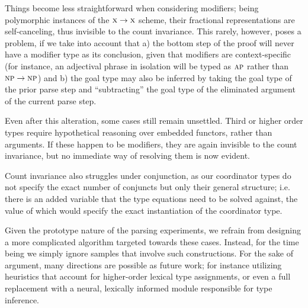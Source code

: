 Things become less straightforward when considering modifiers; being polymorphic instances of the $\textsc{x} \to \textsc{x}$ scheme, their fractional representations are self-canceling, thus invisible to the count invariance.
This rarely, however, poses a problem, if we take into account that a) the bottom step of the proof will never have a modifier type as its conclusion, given that modifiers are context-specific (for instance, an adjectival phrase in isolation will be typed as $\textsc{ap}$ rather than $\textsc{np} \to \textsc{np}$) and b) the goal type may also be inferred by taking the goal type of the prior parse step and ``subtracting'' the goal type of the eliminated argument of the current parse step.

Even after this alteration, some cases still remain unsettled.
Third or higher order types require hypothetical reasoning over embedded functors, rather than arguments.
If these happen to be modifiers, they are again invisible to the count invariance, but no immediate way of resolving them is now evident.

Count invariance also struggles under conjunction, as our coordinator types do not specify the exact number of conjuncts but only their general structure; i.e. there is an added variable that the type equations need to be solved against, the value of which would specify the exact instantiation of the coordinator type. 

Given the prototype nature of the parsing experiments, we refrain from designing a more complicated algorithm targeted towards these cases.
Instead, for the time being we simply ignore samples that involve such constructions.
For the sake of argument, many directions are possible as future work; for instance utilizing heuristics that account for higher-order lexical type assignments, or even a full replacement with a neural, lexically informed module responsible for type inference.

